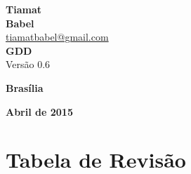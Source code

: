 \documentclass[11pt]{article} %
\begin{document}
\color{white}
\pagestyle{plain}
\def\footnotelayout{\color{white}}
\renewcommand\thefootnote{\textcolor{white}{\arabic{footnote}}}
\begin{titlepage}
 \vfill
  \begin{center}
   {\large \textbf{Tiamat}} \\
   {\large \textbf{Babel}}\\
   {\large \href{mailto:tiamatbabel@gmail.com}{tiamatbabel@gmail.com}}\\[6cm]


   {\Large \textbf{GDD}}\\
   {\Large Versão 0.6}\\[6cm]

   \hspace{.45\textwidth} %
  \vfill

\vspace{2cm}

\large \textbf{Brasília}

\large \textbf{Abril de 2015}
\end{center}
\end{titlepage}
\newpage

\tableofcontents

\newpage


\color{white}

\section*{Tabela de Revisão}
\end{document}
